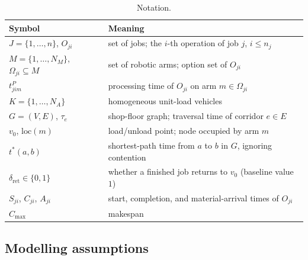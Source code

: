 \begin{table}[t]
\caption{Notation.}
\label{tab:notation}
\small
\begin{tabular}{@{}ll@{}}
\toprule
Symbol & Meaning \\
\midrule
$J=\{1,\dots,n\}$, $O_{ji}$ & set of jobs; the $i$-th operation of job $j$, $i\le n_j$ \\
$M=\{1,\dots,N_M\}$, $\Omega_{ji}\subseteq M$ & set of robotic arms; option set of $O_{ji}$ \\
$t^P_{jim}$ & processing time of $O_{ji}$ on arm $m\in\Omega_{ji}$ \\
$K=\{1,\dots,N_A\}$ & homogeneous unit-load vehicles \\
$G=(V,E)$, $\tau_e$ & shop-floor graph; traversal time of corridor $e\in E$ \\
$v_0$, $\mathrm{loc}(m)$ & load/unload point; node occupied by arm $m$ \\
$t^{*}(a,b)$ & shortest-path time from $a$ to $b$ in $G$, ignoring contention \\
$\delta_{\mathrm{ret}}\in\{0,1\}$ & whether a finished job returns to $v_0$ (baseline value $1$) \\
$S_{ji}$, $C_{ji}$, $A_{ji}$ & start, completion, and material-arrival times of $O_{ji}$ \\
$C_{\max}$ & makespan \\
\bottomrule
\end{tabular}
\end{table}

\subsection{Modelling assumptions}
\label{sec:assumptions}

